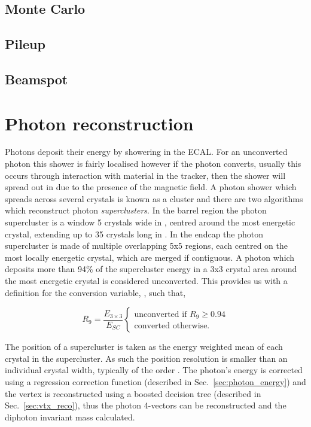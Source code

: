 \subsection{Monte Carlo}
\subsection{Pileup}
\subsection{Beamspot}

\section{Photon reconstruction}
\label{sec:photon_reco}

Photons deposit their energy by showering in the ECAL. For an unconverted photon this shower is fairly localised however if the photon converts, usually this occurs through interaction with material in the tracker, then the shower will spread out in \phi due to the presence of the magnetic field. A photon shower which spreads across several crystals is known as a cluster and there are two algorithms which reconstruct photon \emph{superclusters}. In the barrel region the photon supercluster is a window 5 crystals wide in \eta, centred around the most energetic crystal, extending up to 35 crystals long in \phi. In the endcap the photon supercluster is made of multiple overlapping 5x5 regions, each centred on the most locally energetic crystal, which are merged if contiguous. A photon which deposits more than 94\% of the supercluster energy in a 3x3 crystal area around the most energetic crystal is considered unconverted. This provides us with a definition for the conversion variable, \rnine, such that,

\begin{equation}
	R_{9} = \frac{E_{3\times3}}{E_{SC}} 
	\begin{cases}
		\text{unconverted if } R_9\geq0.94 \\
		\text{converted otherwise}.
	\end{cases}
\end{equation}

The position of a supercluster is taken as the energy weighted mean of each crystal in the supercluster. As such the position resolution is smaller than an individual crystal width, typically of the order . The photon's energy is corrected using a regression correction function (described in Sec.~\ref{sec:photon_energy}) and the vertex is reconstructed using a boosted decision tree (described in Sec.~\ref{sec:vtx_reco}), thus the photon 4-vectors can be reconstructed and the diphoton invariant mass calculated.

